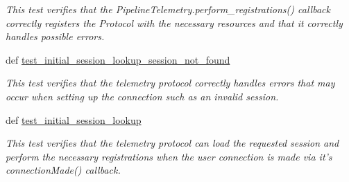 \begin{DoxyCompactItemize}
\begin{DoxyCompactList}\small\item\em This test verifies that the Pipeline\-Telemetry.\-perform\-\_\-registrations() callback correctly registers the Protocol with the necessary resources and that it correctly handles possible errors. \end{DoxyCompactList}\item 
def \hyperlink{classhwm_1_1network_1_1protocols_1_1tests_1_1test__telemetry__protocol_1_1_test_pipeline_telemetry_protocol_aaeb38296cc22748c625fb338b30f33d5}{test\-\_\-initial\-\_\-session\-\_\-lookup\-\_\-session\-\_\-not\-\_\-found}
\begin{DoxyCompactList}\small\item\em This test verifies that the telemetry protocol correctly handles errors that may occur when setting up the connection such as an invalid session. \end{DoxyCompactList}\item 
def \hyperlink{classhwm_1_1network_1_1protocols_1_1tests_1_1test__telemetry__protocol_1_1_test_pipeline_telemetry_protocol_a25aaff647c8c34d4ba819f472fa5b539}{test\-\_\-initial\-\_\-session\-\_\-lookup}
\begin{DoxyCompactList}\small\item\em This test verifies that the telemetry protocol can load the requested session and perform the necessary registrations when the user connection is made via it's connection\-Made() callback. \end{DoxyCompactList}\end{DoxyCompactItemize}
